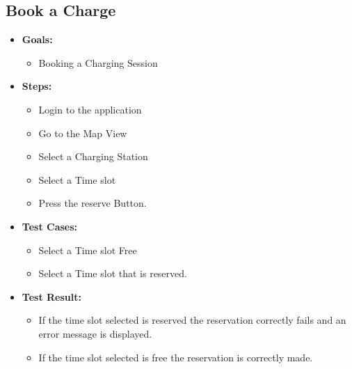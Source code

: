 \documentclass{Configuration_Files/PoliMi3i_thesis}
\begin{document}
\subsection{Book a Charge}
\begin{itemize}
    \item\textbf{Goals:}
        \begin{itemize}
            \item Booking a Charging Session
       \end{itemize}
    \item \textbf{Steps:}
        \begin{itemize}
            \item Login to the application  
            \item Go to the Map View 
            \item Select a Charging Station
            \item Select a Time slot 
            \item Press the reserve Button.
        \end{itemize}
    \item \textbf{Test Cases:}
        \begin{itemize}
            \item Select a Time slot Free 
            \item Select a Time slot that is reserved. 
        \end{itemize}
    \item\textbf{Test Result:}
        \begin{itemize}
            \item If the time slot selected is reserved the reservation correctly fails and an error message is displayed. 
            \item If the time slot selected is free the reservation is correctly made. 
    \end{itemize}
\end{itemize}
\end{document}
